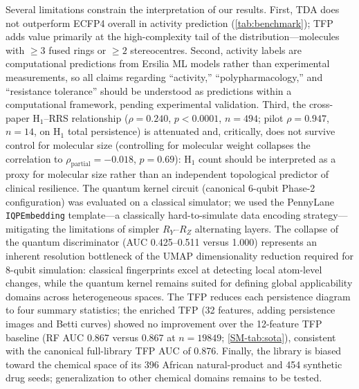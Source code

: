 \documentclass[11pt,a4paper]{article}
\begin{document}
Several limitations constrain the interpretation of our results. First, TDA does not outperform ECFP4 overall in activity prediction (\cref{tab:benchmark}); TFP adds value primarily at the high-complexity tail of the distribution---molecules with $\geq 3$ fused rings or $\geq 2$ stereocentres. Second, activity labels are computational predictions from Ersilia ML models rather than experimental measurements, so all claims regarding ``activity,'' ``polypharmacology,'' and ``resistance tolerance'' should be understood as predictions within a computational framework, pending experimental validation. Third, the cross-paper H$_1$--RRS relationship ($\rho = \num{0.240}$, $p < \num{0.0001}$, $n = \num{494}$; pilot $\rho = \num{0.947}$, $n = \num{14}$, on H$_1$ total persistence) is attenuated and, critically, does not survive control for molecular size (controlling for molecular weight collapses the correlation to $\rho_{\text{partial}} = -\num{0.018}$, $p = \num{0.69}$): H$_1$ count should be interpreted as a proxy for molecular size rather than an independent topological predictor of clinical resilience. The quantum kernel circuit (canonical 6-qubit Phase-2 configuration) was evaluated on a classical simulator; we used the PennyLane \texttt{IQPEmbedding} template---a classically hard-to-simulate data encoding strategy---mitigating the limitations of simpler $R_Y$--$R_Z$ alternating layers. The collapse of the quantum discriminator (AUC \numrange{0.425}{0.511} versus \num{1.000}) represents an inherent resolution bottleneck of the UMAP dimensionality reduction required for 8-qubit simulation: classical fingerprints excel at detecting local atom-level changes, while the quantum kernel remains suited for defining global applicability domains across heterogeneous spaces. The TFP reduces each persistence diagram to four summary statistics; the enriched TFP (32 features, adding persistence images and Betti curves) showed no improvement over the 12-feature TFP baseline (RF AUC \num{0.867} versus \num{0.867} at $n = \num{19849}$; \cref{SM-tab:sota}), consistent with the canonical full-library TFP AUC of \num{0.876}. Finally, the library is biased toward the chemical space of its 396 African natural-product and 454 synthetic drug seeds; generalization to other chemical domains remains to be tested.
\end{document}
